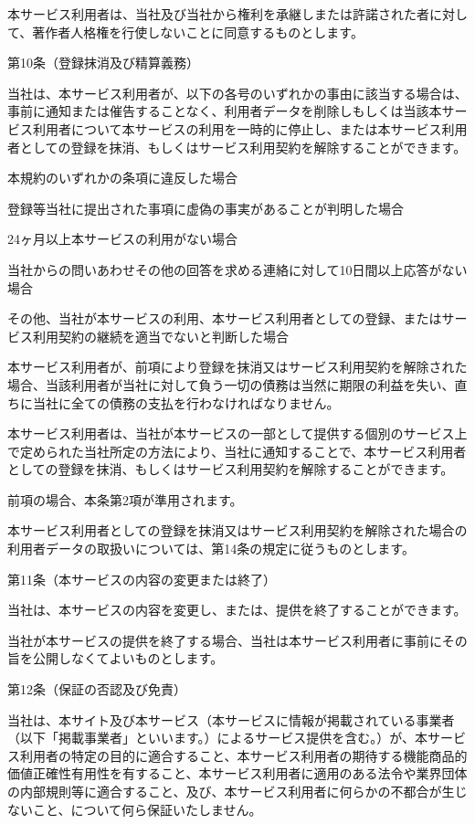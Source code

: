     本サービス利用者は、当社及び当社から権利を承継しまたは許諾された者に対して、著作者人格権を行使しないことに同意するものとします。

第10条（登録抹消及び精算義務）

    当社は、本サービス利用者が、以下の各号のいずれかの事由に該当する場合は、事前に通知または催告することなく、利用者データを削除しもしくは当該本サービス利用者について本サービスの利用を一時的に停止し、または本サービス利用者としての登録を抹消、もしくはサービス利用契約を解除することができます。

        本規約のいずれかの条項に違反した場合

        登録等当社に提出された事項に虚偽の事実があることが判明した場合

        24ヶ月以上本サービスの利用がない場合

        当社からの問いあわせその他の回答を求める連絡に対して10日間以上応答がない場合

        その他、当社が本サービスの利用、本サービス利用者としての登録、またはサービス利用契約の継続を適当でないと判断した場合

    本サービス利用者が、前項により登録を抹消又はサービス利用契約を解除された場合、当該利用者が当社に対して負う一切の債務は当然に期限の利益を失い、直ちに当社に全ての債務の支払を行わなければなりません。

    本サービス利用者は、当社が本サービスの一部として提供する個別のサービス上で定められた当社所定の方法により、当社に通知することで、本サービス利用者としての登録を抹消、もしくはサービス利用契約を解除することができます。

    前項の場合、本条第2項が準用されます。

    本サービス利用者としての登録を抹消又はサービス利用契約を解除された場合の利用者データの取扱いについては、第14条の規定に従うものとします。

第11条（本サービスの内容の変更または終了）

    当社は、本サービスの内容を変更し、または、提供を終了することができます。

    当社が本サービスの提供を終了する場合、当社は本サービス利用者に事前にその旨を公開しなくてよいものとします。

第12条（保証の否認及び免責）

    当社は、本サイト及び本サービス（本サービスに情報が掲載されている事業者（以下「掲載事業者」といいます。）によるサービス提供を含む。）が、本サービス利用者の特定の目的に適合すること、本サービス利用者の期待する機能商品的価値正確性有用性を有すること、本サービス利用者に適用のある法令や業界団体の内部規則等に適合すること、及び、本サービス利用者に何らかの不都合が生じないこと、について何ら保証いたしません。

